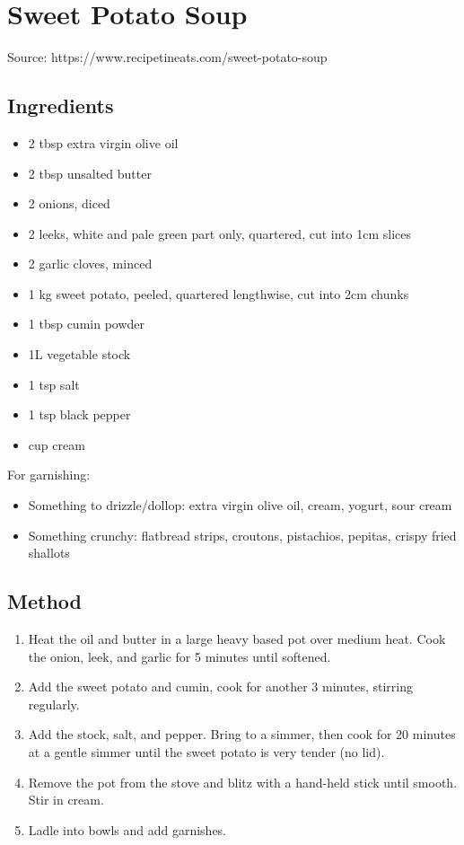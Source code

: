 \clearpage
\section{Sweet Potato Soup}


Source: https://www.recipetineats.com/sweet-potato-soup

\subsection{Ingredients}

\begin{itemize}
    \item 2 tbsp extra virgin olive oil
    \item 2 tbsp unsalted butter
    \item 2 onions, diced
    \item 2 leeks, white and pale green part only, quartered, cut into 1cm slices
    \item 2 garlic cloves, minced
    \item 1 kg sweet potato, peeled, quartered lengthwise, cut into 2cm chunks
    \item 1 tbsp cumin powder
    \item 1L vegetable stock
    \item 1 tsp salt
    \item 1 tsp black pepper
    \item {} cup cream
\end{itemize}

For garnishing:

\begin{itemize}
    \item Something to drizzle/dollop: extra virgin olive oil, cream, yogurt, sour cream
    \item Something crunchy: flatbread strips, croutons, pistachios, pepitas, crispy fried shallots
\end{itemize}

\subsection{Method}

\begin{enumerate}
    \item Heat the oil and butter in a large heavy based pot over medium heat. Cook the onion, leek, and garlic for 5 minutes until softened.
    \item Add the sweet potato and cumin, cook for another 3 minutes, stirring regularly.
    \item Add the stock, salt, and pepper. Bring to a simmer, then cook for 20 minutes at a gentle simmer until the sweet potato is very tender (no lid).
    \item Remove the pot from the stove and blitz with a hand-held stick until smooth. Stir in cream.
    \item Ladle into bowls and add garnishes.
\end{enumerate}
